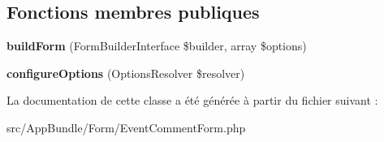 \subsection*{Fonctions membres publiques}
\begin{DoxyCompactItemize}
\item 
\mbox{\label{classAppBundle_1_1Form_1_1EventCommentForm_a68bf60c94461bd12e1afcf17912b14e2}} 
{\bfseries build\+Form} (Form\+Builder\+Interface \$builder, array \$options)
\item 
\mbox{\label{classAppBundle_1_1Form_1_1EventCommentForm_a0dc44ea425174d99e3de9e93b32ae077}} 
{\bfseries configure\+Options} (Options\+Resolver \$resolver)
\end{DoxyCompactItemize}


La documentation de cette classe a été générée à partir du fichier suivant \+:\begin{DoxyCompactItemize}
\item 
src/\+App\+Bundle/\+Form/Event\+Comment\+Form.\+php\end{DoxyCompactItemize}
